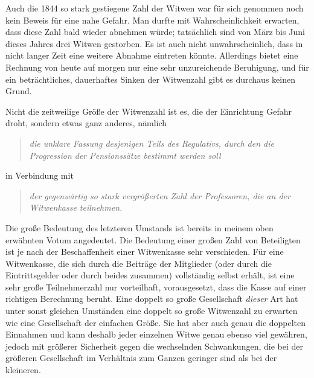 Auch die 1844 so stark gestiegene Zahl der Witwen war für sich genommen noch kein Beweis für eine nahe Gefahr. Man durfte mit Wahrscheinlichkeit erwarten, dass diese Zahl bald wieder abnehmen würde; tatsächlich sind von März bis Juni dieses Jahres drei Witwen gestorben. Es ist auch nicht unwahrscheinlich, dass in nicht langer Zeit eine weitere Abnahme eintreten könnte. Allerdings bietet eine Rechnung von heute auf morgen nur eine sehr unzureichende Beruhigung, und für ein beträchtliches, dauerhaftes Sinken der Witwenzahl gibt es durchaus keinen Grund.

Nicht die zeitweilige Größe der Witwenzahl ist es, die der Einrichtung Gefahr droht, sondern etwas ganz anderes, nämlich
\begin{quote}\textit{die unklare Fassung desjenigen Teils des Regulativs, durch den die Progression der Pensionssätze bestimmt werden soll}\end{quote}
in Verbindung mit
\begin{quote}\raggedright\textit{der gegenwärtig so stark vergrößerten Zahl der Professoren, die an der Witwenkasse teilnehmen.}\end{quote}
\noindent\hspace*{\parindent}Die große Bedeutung des letzteren Umstands ist bereits in meinem oben erwähnten Votum angedeutet. Die Bedeutung einer großen Zahl von Beteiligten ist je nach der Beschaffenheit einer Witwenkasse sehr verschieden. Für eine Witwenkasse, die sich durch die Beiträge der Mitglieder (oder durch die Eintrittsgelder oder durch beides zusammen) vollständig selbst erhält, ist eine sehr große Teilnehmerzahl nur vorteilhaft, vorausgesetzt, dass die Kasse auf einer richtigen Berechnung beruht. Eine doppelt so große Gesellschaft \textit{dieser} Art hat unter sonst gleichen Umständen eine doppelt so große Witwenzahl zu erwarten wie eine Gesellschaft der einfachen Größe. Sie hat aber auch genau die doppelten Einnahmen und kann deshalb jeder einzelnen Witwe genau ebenso viel gewähren, jedoch mit größerer Sicherheit gegen die wechselnden Schwankungen, die bei der größeren Gesellschaft im Verhältnis zum Ganzen geringer sind als bei der kleineren.

